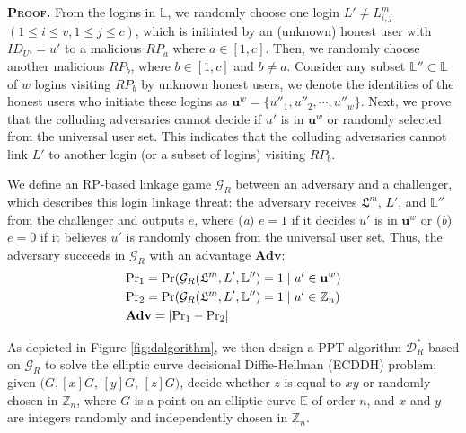 \noindent\textbf{\textsc{Proof.}} From the logins in $\mathbb{L}$,
 we randomly choose one login $L' \neq L^m_{i,j}$ $(1 \le i \le v, 1 \le j \le c)$,
 which is initiated by an (unknown) honest user with $ID_{U'}=u'$ to a malicious $RP_{a}$ where $a \in [1,c]$.
Then, we randomly choose another malicious $RP_{b}$, where $b \in [1,c]$ and $b \neq a$.
Consider any subset $\mathbb{L}'' \subset \mathbb{L}$ of $w$ logins visiting $RP_{b}$ by unknown honest users,
 we denote the identities of the honest users who initiate these logins as $\mathbf{u}^w=\{{u''_1}, {u''_2}, \cdots, {u''_w}\}$.
Next, we prove that the colluding adversaries cannot decide if $u'$ is in $\mathbf{u}^w$ or randomly selected from the universal user set.
This indicates that the colluding adversaries cannot link $L'$ to another login (or a subset of logins) visiting $RP_{b}$.


We define an RP-based linkage game $\mathcal{G}_R$ between an adversary and a challenger, which describes this login linkage threat: the adversary receives $\mathfrak{L}^m$, $L'$, and $\mathbb{L}''$ from the challenger and outputs $e$, where (\emph{a}) $e = 1$ if it decides $u'$ is in $\mathbf{u}^w$ %
or (\emph{b}) $e=0$ if it believes $u'$ is randomly chosen from the universal user set.
Thus, the adversary succeeds in $\mathcal{G}_R$ with an advantage $\mathbf{Adv}$:
\begin{align*}
&{\rm Pr}_1={\rm Pr}(\mathcal{G}_R(\mathfrak{L}^m, L', \mathbb{L}'')=1 \;| \; u' \in \mathbf{u}^w)  \\
&{\rm Pr}_2={\rm Pr}(\mathcal{G}_R(\mathfrak{L}^m, L', \mathbb{L}'')=1 \; | \; u' \in \mathbb{Z}_n)\\
&{\mathbf{Adv}}=|{\rm Pr}_1-{\rm Pr}_2|
\end{align*}

As depicted in Figure \ref{fig:dalgorithm}, we then design a PPT algorithm $\mathcal{D}^*_R$ based on $\mathcal{G}_R$ to solve the elliptic curve decisional Diffie-Hellman (ECDDH) problem: given $(G, [x]G$, $[y]G$, $[z]G)$, decide whether $z$ is equal to $xy$ or randomly chosen in $\mathbb{Z}_n$, where $G$ is a point on an elliptic curve $\mathbb{E}$ of order $n$, and $x$ and $y$ are integers randomly and independently chosen in $\mathbb{Z}_n$.


